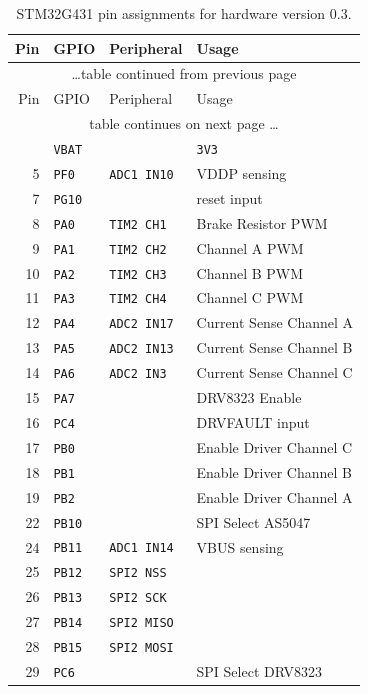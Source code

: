 \documentclass[12pt,a4paper,oneside,openany]{article}
\begin{document}
\begin{longtable}[htbp]{@{}rlll@{}}%
\caption{STM32G431 pin assignments for hardware version 0.3. \label{tab:mcu-pins}} \\
\toprule 
        Pin & GPIO         & Peripheral        & Usage \\
\midrule 
\endfirsthead
\multicolumn{4}{c}{\ldots table continued from previous page} \\
\midrule
         Pin & GPIO         & Peripheral        & Usage \\
\midrule
\endhead
\multicolumn{4}{c}{table continues on next page \ldots} \\
\endfoot
\bottomrule
\endlastfoot
          1 & \texttt{VBAT} &                   & \texttt{3V3}  \\
\midrule  5 & \texttt{PF0}  &\texttt{ADC1 IN10} & VDDP sensing \\
\midrule  7 & \texttt{PG10} &                   & reset input \\
\midrule  8 & \texttt{PA0}  &\texttt{TIM2 CH1}  & Brake Resistor PWM \\
          9 & \texttt{PA1}  &\texttt{TIM2 CH2}  & Channel A PWM \\
         10 & \texttt{PA2}  &\texttt{TIM2 CH3}  & Channel B PWM \\
         11 & \texttt{PA3}  &\texttt{TIM2 CH4}  & Channel C PWM \\
\midrule 12 & \texttt{PA4}  &\texttt{ADC2 IN17} & Current Sense Channel A \\
         13 & \texttt{PA5}  &\texttt{ADC2 IN13} & Current Sense Channel B \\
         14 & \texttt{PA6}  &\texttt{ADC2 IN3}  & Current Sense Channel C \\
\midrule 15 & \texttt{PA7}  &                   & DRV8323 Enable \\
\midrule 16 & \texttt{PC4}  &                   & DRVFAULT input \\
\midrule 17 & \texttt{PB0}  &                   & Enable Driver Channel C \\
         18 & \texttt{PB1}  &                   & Enable Driver Channel B \\
         19 & \texttt{PB2}  &                   & Enable Driver Channel A \\
\midrule 22 & \texttt{PB10} &                   & SPI Select AS5047 \\
\midrule 24 & \texttt{PB11} &\texttt{ADC1 IN14} & VBUS sensing \\
\midrule 25 & \texttt{PB12} &\texttt{SPI2 NSS}  &  \\
         26 & \texttt{PB13} &\texttt{SPI2 SCK}  &  \\
         27 & \texttt{PB14} &\texttt{SPI2 MISO} &  \\
         28 & \texttt{PB15} &\texttt{SPI2 MOSI} &  \\
\midrule 29 & \texttt{PC6}  &                   & SPI Select DRV8323 \\


\end{longtable}
\end{document}

